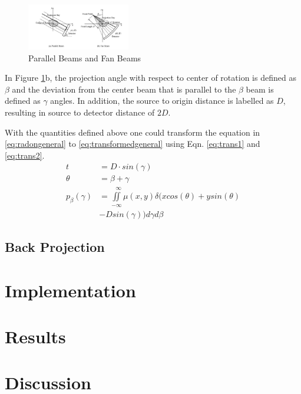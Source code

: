 \documentclass[journal]{IEEEtran}
\begin{document}
\begin{figure}[h]
\centering
\includegraphics[width=0.4\textwidth]{images/PvsB.jpg}
\caption{Parallel Beams and Fan Beams \cite{zeng2017image}}\label{fig:PvsB}
\end{figure}

In Figure \ref{fig:PvsB}b, the projection angle with respect to center of rotation is defined as $\beta$ and the deviation from the center beam that is parallel to the $\beta$ beam is defined as $\gamma$ angles. In addition, the source to origin distance is labelled as $D$, resulting in source to detector distance of $2D$. 

With the quantities defined above one could transform the equation in \ref{eq:radongeneral} to \ref{eq:transformedgeneral} using Eqn. \ref{eq:trans1} and \ref{eq:trans2}.
\begin{align}
	t &= D \cdot sin(\gamma) \label{eq:trans1} \\
	\theta &= \beta + \gamma \label{eq:trans2} \\
	p_{\beta}(\gamma) &= \iint\limits_{-\infty}^{\ \ \ \infty}\mu(x,y)\delta(xcos(\theta)+ysin(\theta) \label{eq:transformedgeneral} \\&-Dsin(\gamma))d\gamma d\beta \nonumber 
\end{align}
\subsection{Back Projection}



\section{Implementation} \label{sec:implementation}

\section{Results} \label{sec:results}

\section{Discussion} \label{sec:discuss}

\printbibliography
\end{document}
